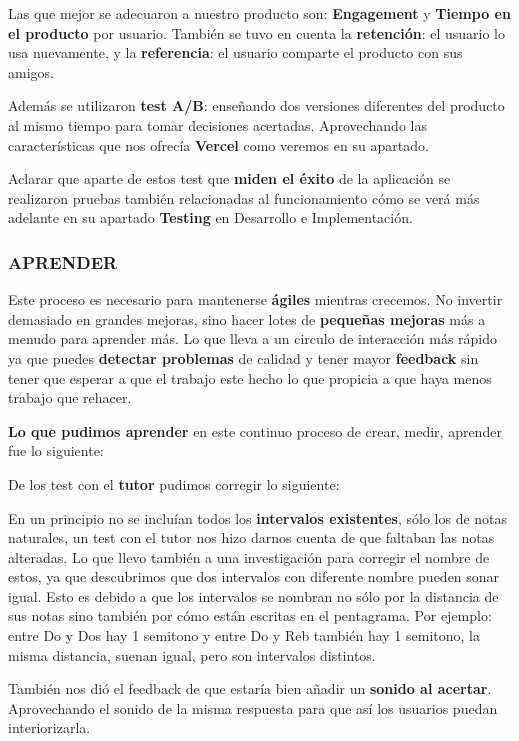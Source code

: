\documentclass[12pt,twoside,titlepage]{report}
\begin{document}
Las que mejor se adecuaron a nuestro producto son: \textbf{Engagement} y \textbf{Tiempo en el producto} por usuario. También se tuvo en cuenta la \textbf{retención}: el usuario lo usa nuevamente, y la \textbf{referencia}: el usuario comparte el producto con sus amigos.

Además se utilizaron \textbf{test A/B}: enseñando dos versiones diferentes del producto al mismo tiempo para tomar decisiones acertadas. Aprovechando las características que nos ofrecía \textbf{Vercel} como veremos en su apartado.

Aclarar que aparte de estos test que \textbf{miden el éxito} de la aplicación se realizaron pruebas también relacionadas al funcionamiento cómo se verá más adelante en su apartado \textbf{Testing} en Desarrollo e Implementación.

\subsubsection{APRENDER}

Este proceso es necesario para mantenerse \textbf{ágiles} mientras crecemos. No invertir demasiado en grandes mejoras, sino hacer lotes de \textbf{pequeñas mejoras} más a menudo para aprender más. Lo que lleva a un circulo de interacción más rápido ya que puedes \textbf{detectar problemas} de calidad y tener mayor \textbf{feedback} sin tener que esperar a que el trabajo este hecho lo que propicia a que haya menos trabajo que rehacer.

\textbf{Lo que pudimos aprender} en este continuo proceso de crear, medir, aprender fue lo siguiente:

De los test con el \textbf{tutor} pudimos corregir lo siguiente:

En un principio no se incluían todos los \textbf{intervalos existentes}, sólo los de notas naturales, un test con el tutor nos hizo darnos cuenta de que faltaban las notas alteradas. Lo que llevo también a una investigación para corregir el nombre de estos, ya que descubrimos que dos intervalos con diferente nombre pueden sonar igual. Esto es debido a que los intervalos se nombran no sólo por la distancia de sus notas sino también por cómo están escritas en el pentagrama. Por ejemplo: entre Do y Dos hay 1 semitono y entre Do y Reb también hay 1 semitono, la misma distancia, suenan igual, pero son intervalos distintos.

También nos dió el feedback de que estaría bien añadir un \textbf{sonido al acertar}. Aprovechando el sonido de la misma respuesta para que así los usuarios puedan interiorizarla.
\end{document}

